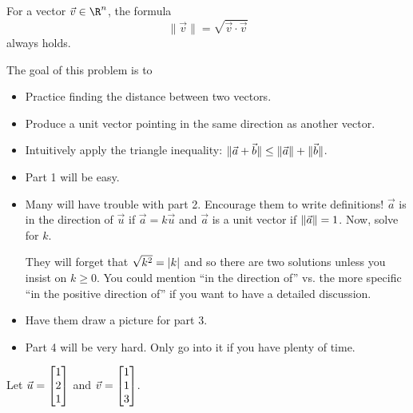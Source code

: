 	\begin{bookonly}\singlegrid\end{bookonly}

	\bookonlynewpage
	\displayonlynewpage
	\begin{theorem}
		For a vector $\vec v\in \R^n$, the formula
		\[
			\|\vec v\| = \sqrt{\vec v\cdot \vec v}
		\]
		always holds.
	\end{theorem}



	\question
	\begin{annotation}
		\begin{goals}

			The goal of this problem is to
			\begin{itemize}
				\item Practice finding the distance between two vectors.
				\item Produce a unit vector pointing in the same direction as another vector.
				\item Intuitively apply the triangle inequality: $\lVert\vec a+\vec b\rVert\leq \lVert\vec a\rVert+\lVert\vec b\rVert$.
			\end{itemize}
		\end{goals}

		\begin{notes}
			\begin{itemize}
				\item Part 1 will be easy.
				\item Many will have trouble with part 2. Encourage them to write definitions! $\vec a$ is
					in the direction of $\vec u$ if $\vec a=k\vec u$ and $\vec a$ is a unit vector if $\lVert\vec a\rVert=1$.
					Now, solve for $k$.

					They will forget that $\sqrt{k^2}=\lvert k\rvert$ and so there are two solutions
					unless you insist on $k\geq 0$. You could mention ``in the direction of'' vs. the
					more specific ``in the positive direction of'' if you want to have a detailed discussion.
				\item Have them draw a picture for part 3.
				\item Part 4 will be very hard. Only go into it if you have plenty of time.
			\end{itemize}
		\end{notes}
	\end{annotation}
	Let $\vec u=\mat{1\\2\\1}$ and $\vec v=\mat{1\\1\\3}$.
